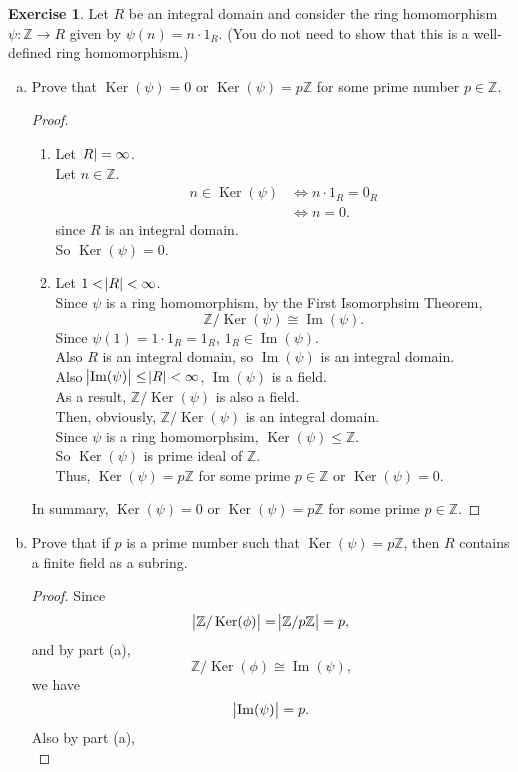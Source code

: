 \documentclass{article}
\newcommand{\bbz}{\mathbb{Z}}
\renewcommand{\ker}{\operatorname{Ker}}
\newcommand{\im}{\operatorname{Im}}
\theoremstyle{plain}
\theoremstyle{definition}
\newtheorem{exer}[lem]{Exercise}
\begin{document}
\begin{exer}
Let $R$ be an integral domain and consider the ring homomorphism $\psi\colon\bbz\to R$ given by $\psi(n)=n\cdot 1_R$.
(You do not need to show that this is a well-defined ring homomorphism.)
\begin{enumerate}[(a)]
\item Prove that $\ker(\psi)=0$ or $\ker(\psi)=p\bbz$ for some prime number $p\in\bbz$.
    \begin{proof}
        \begin{enumerate}[(1)]
            \item
            Let $\abs{R} = \infty$.\\
             Let $n \in \bbz$.
             \begin{align*}
                  n \in \ker(\psi) &\Longleftrightarrow n\cdot 1_R =0_R \\
                 &\Longleftrightarrow n = 0.
            \end{align*}
            since $R$ is an integral domain.\\
            So $\ker(\psi)  = 0$.
        \item Let $1<\abs{R}  < \infty$. \\
            Since $\psi$ is a ring homomorphism, by the First Isomorphsim Theorem,  
            \[\bbz / \ker(\psi) \cong \im(\psi).\]
            Since $\psi(1) = 1\cdot 1_R = 1_R$, $1_R \in \im(\psi)$.\\
            Also $R$ is an integral domain, so $\im(\psi)$ is an integral domain.\\
            Also $\abs{\im(\psi)} \leq \abs{R} < \infty$, $\im(\psi)$ is a field.\\
            As a result, $\bbz / \ker(\psi)$ is also a field.\\
            Then, obviously, $\bbz / \ker(\psi)$ is an integral domain.\\
            Since $\psi$ is a ring homomorphsim, $\ker(\psi) \leq \bbz$.\\
            So $\ker(\psi)$ is prime ideal of $\bbz$.\\
            Thus, $\ker(\psi) = p \bbz$ for some prime $p \in \bbz$ or $\ker(\psi) = 0$.
    \end{enumerate}
    In summary, $\ker(\psi) = 0$ or $\ker(\psi) = p \bbz$ for some prime $p \in \bbz$. 
    \end{proof}
\item 
    Prove that if $p$ is a prime number such that $\ker(\psi)=p\bbz$, then $R$ contains a finite field as a subring.
    \begin{proof}
    Since 
    \[\abs{\bbz / \ker(\phi)} = \abs{\bbz / p\bbz} =  p,\]
    and by part (a),
    \[\bbz / \ker(\phi) \cong \im(\psi),\]
    we have
    \[\abs{\im(\psi)} = p.\]
    Also by part (a),
    \[\]



\end{proof}
\end{enumerate}
\end{exer}
\end{document}
